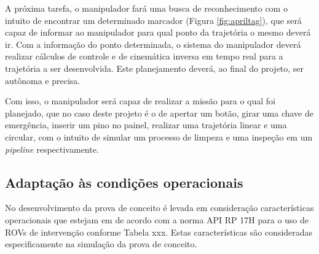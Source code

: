 A próxima tarefa, o manipulador fará uma busca de reconhecimento com o intuito de encontrar um determinado marcador (Figura \ref{fig:apriltag}), que será capaz de informar ao manipulador para qual ponto da trajetória o mesmo deverá ir. Com a informação do ponto determinada, o sistema do manipulador deverá realizar cálculos de controle e de cinemática inversa em tempo real para a trajetória a ser desenvolvida. Este planejamento deverá, ao final do projeto, ser autônoma e precisa.

Com isso, o manipulador será capaz de realizar a missão para o qual foi planejado, que no caso deste projeto é o de apertar um botão, girar uma chave de emergência, inserir um pino no painel, realizar uma trajetória linear e uma circular, com o intuito de simular um processo de limpeza e uma inspeção em um \textit{pipeline} respectivamente.



\subsection{Adaptação às condições operacionais}
\label{ssec:adap}
No desenvolvimento da prova de conceito é levada em consideração características operacionais que estejam em de acordo com a norma API RP 17H para o uso de ROVs de intervenção conforme Tabela xxx. Estas características são consideradas especificamente na simulação da prova de conceito. 




%
